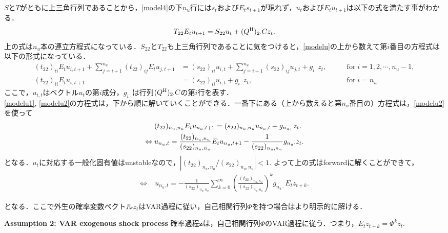 \documentclass[a4j, dvipdfmx]{jarticle}
\begin{document}
$S$と$T$がともに上三角行列であることから，\eqref{model4}の下$n_u$行には$s_t$および$E_ts_{t+1}$が現れず，$u_t$および$E_tu_{t+1}$は以下の式を満たす事がわかる．
\begin{align}
T_{22}E_tu_{t+1} = S_{22}u_t + (Q^{\rm{H}})_{2\cdot}Cz_t. \label{modelu}
\end{align}
上の式は$n_u$本の連立方程式になっている．$S_{22}$と$T_{22}$も上三角行列であることに気をつけると，\eqref{modelu}の上から数えて第$i$番目の方程式は以下の形式になっている．
\begin{align}
(t_{22})_{ii}E_tu_{i,t+1} + \sum_{j=i+1}^{n_u}(t_{22})_{ij}E_tu_{j,t+1} &= (s_{22})_{ii}u_{i,t} + \sum_{j=i+1}^{n_u}(s_{22})_{ij}u_{j,t} + g_{i\cdot}z_t, \qquad &\text{for} \; i = 1,2,\cdots, n_u-1,\label{modelu1}\\
(t_{22})_{ii}E_tu_{i,t+1} &= (s_{22})_{ii}u_{i,t} + g_{i\cdot}z_t, & \text{for} \; i=n_u. \label{modelu2}
\end{align}
ここで，$u_{i,t}$はベクトル$u_t$の第$i$成分，$g_{i\cdot}$は行列$(Q^{\rm{H}})_{2\cdot}C$の第$i$行を表す．\\

\eqref{modelu1}, \eqref{modelu2}の方程式は，下から順に解いていくことができる．一番下にある（上から数えると第$n_u$番目の）方程式は，\eqref{modelu2}を使って
\begin{align}
&(t_{22})_{n_u,n_u} E_tu_{n_u,t+1} = (s_{22})_{n_u,n_u}u_{n_u,t} + g_{n_u,\cdot}z_t.\notag\\
\Leftrightarrow \; &u_{n_u,t} = \frac{(t_{22})_{n_u,n_u}}{(s_{22})_{n_u,n_u}}E_tu_{n_u,t+1} - \frac{1}{(s_{22})_{n_u,n_u}}g_{n_u\cdot}z_t.\notag
\end{align}
となる．$u_t$に対応する一般化固有値はunstableなので，$|(t_{22})_{n_u,n_u}/(s_{22})_{n_u,n_u}|<1$. よって上の式はforwardに解くことができて，
\begin{align}
\Leftrightarrow \; &u_{n_u,t} = - \frac{1}{(s_{22})_{n_u,n_u}} \sum_{k = 0}^\infty \left(\frac{(t_{22})_{n_u,n_u}}{(s_{22})_{n_u,n_u}}\right)^k g_{n_u\cdot}E_tz_{t+k}.\label{modelu3}
\end{align}


となる．ここで外生の確率変数ベクトル$z_t$はVAR過程に従い，自己相関行列$\Phi$を持つ場合はより明示的に解ける．\\

\begin{itembox}[l]{{\bf Assumption 2: VAR exogenous shock process}}
確率過程$\boldsymbol{z}$は，自己相関行列$\Phi$のVAR過程に従う．つまり，$E_tz_{t+k} = \Phi^kz_t$.
\end{itembox}
\\
\end{document}
